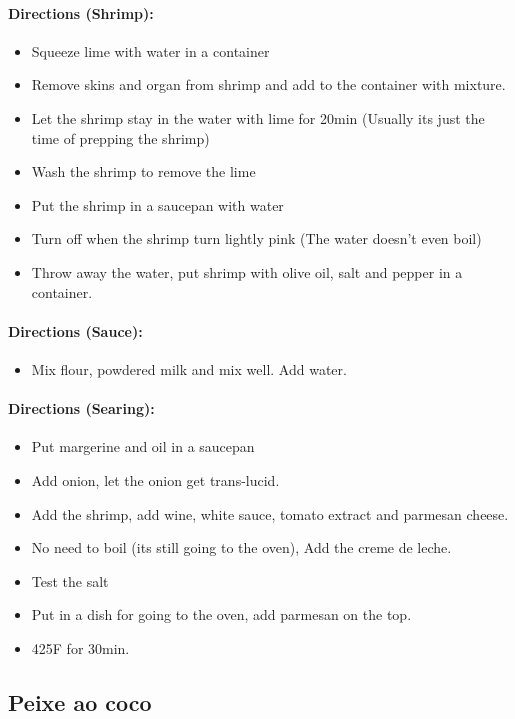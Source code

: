 \documentclass{article}
\begin{document}
\paragraph{Directions (Shrimp):}
\begin{itemize}
    \item Squeeze lime with water in a container
    \item Remove skins and organ from shrimp and add to the container with mixture.
    \item Let the shrimp stay in the water with lime for 20min (Usually its just the time of prepping the shrimp)
    \item Wash the shrimp to remove the lime
    \item Put the shrimp in a saucepan with water
    \item Turn off when the shrimp turn lightly pink (The water doesn't even boil)
    \item Throw away the water, put shrimp with olive oil, salt and pepper in a container.
\end{itemize}  

\paragraph{Directions (Sauce):}
\begin{itemize}
    \item Mix flour, powdered milk and mix well. Add water.
\end{itemize}  

\paragraph{Directions (Searing):}
\begin{itemize}
    \item Put margerine and oil in a saucepan
    \item Add onion, let the onion get trans-lucid.
    \item Add the shrimp, add wine, white sauce, tomato extract and parmesan cheese.
    \item No need to boil (its still going to the oven), Add the creme de leche.
    \item Test the salt
    \item Put in a dish for going to the oven, add parmesan on the top.
    \item 425F for 30min.
\end{itemize} 

\subsection{Peixe ao coco}
\end{document}
